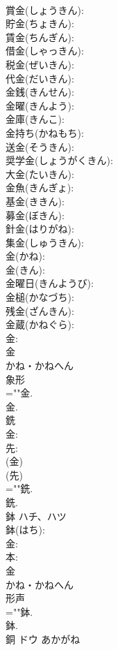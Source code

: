 \documentclass[8pt]{extreport}
\begin{document}
\begin{CJK}{UTF8}{min}
\\	賞金(しょうきん): 
\\	貯金(ちょきん): 
\\	賃金(ちんぎん): 
\\	借金(しゃっきん): 
\\	税金(ぜいきん): 
\\	代金(だいきん): 
\\	金銭(きんせん): 
\\	金曜(きんよう): 
\\	金庫(きんこ): 
\\	金持ち(かねもち): 
\\	送金(そうきん): 
\\	奨学金(しょうがくきん): 
\\	大金(たいきん): 
\\	金魚(きんぎょ): 
\\	基金(ききん): 
\\	募金(ぼきん): 
\\	針金(はりがね): 
\\	集金(しゅうきん): 
\\	金(かね): 
\\	金(きん): 
\\	金曜日(きんようび): 
\\	金槌(かなづち): 
\\	残金(ざんきん): 
\\	金蔵(かねぐら): 
\\	金: 
\\	金	
\\	かね・かねへん	
\\	象形 
\\	=""金.
\\	金.
\\	銑						
\\	金: 
\\	先: 
\\	(金) 
\\	(先) 
\\	=""銑.
\\	銑.
\\	鉢	ハチ、ハツ			
\\	鉢(はち): 
\\	金: 
\\	本: 
\\	金	
\\	かね・かねへん	
\\	形声 
\\	=""鉢.
\\	鉢.
\\	銅	ドウ	あかがね		

\end{CJK}
\end{document}
